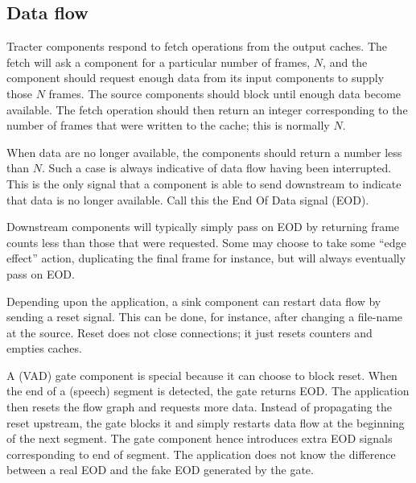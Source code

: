 \subsection{Data flow}

Tracter components respond to fetch operations from the output caches.
The fetch will ask a component for a particular number of frames, $N$,
and the component should request enough data from its input components
to supply those $N$ frames.  The source components should block until
enough data become available.  The fetch operation should then return
an integer corresponding to the number of frames that were written to
the cache; this is normally $N$.

When data are no longer available, the components should return a
number less than $N$.  Such a case is always indicative of data flow
having been interrupted.  This is the only signal that a component is
able to send downstream to indicate that data is no longer available.
Call this the End Of Data signal (EOD).

Downstream components will typically simply pass on EOD by returning
frame counts less than those that were requested.  Some may choose to
take some ``edge effect'' action, duplicating the final frame for
instance, but will always eventually pass on EOD.

Depending upon the application, a sink component can restart data flow
by sending a reset signal.  This can be done, for instance, after
changing a file-name at the source.  Reset does not close connections;
it just resets counters and empties caches.

A (VAD) gate component is special because it can choose to block
reset.  When the end of a (speech) segment is detected, the gate
returns EOD.  The application then resets the flow graph and requests
more data.  Instead of propagating the reset upstream, the gate blocks
it and simply restarts data flow at the beginning of the next segment.
The gate component hence introduces extra EOD signals corresponding to
end of segment.  The application does not know the difference between
a real EOD and the fake EOD generated by the gate.

